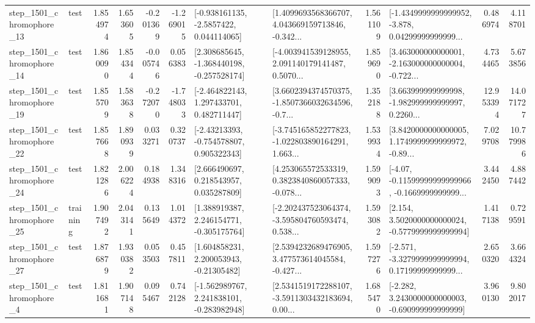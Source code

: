 \begin{tabular}{llrrrrllrlrr}
 step\_1501\_chromophore\_13 &      test &      1.854974 &    1.653605 &     -0.201369 & -1.269015 &     [-0.938161135, -2.5857422, 0.044114065] &  [1.4099693568366707, 4.043669159713846, -0.342... &       1.561109 &  [-1.4349999999999952, -3.878, 0.04299999999999... &            0.486974 &          4.118701 \\
 step\_1501\_chromophore\_14 &      test &      1.860090 &    1.854344 &     -0.005746 &  0.056383 &   [2.308685645, -1.368440198, -0.257528174] &  [-4.003941539128955, 2.091140179141487, 0.5070... &       1.859690 &  [3.463000000000001, -2.163000000000004, -0.722... &            4.734465 &          5.673856 \\
 step\_1501\_chromophore\_19 &      test &      1.855709 &    1.583638 &     -0.272070 & -1.748033 &    [-2.464822143, 1.297433701, 0.482711447] &  [3.6602394374570375, -1.8507366032634596, -0.7... &       1.352188 &  [3.663999999999998, -1.982999999999997, 0.2260... &           12.953394 &         14.071727 \\
 step\_1501\_chromophore\_22 &      test &      1.857668 &    1.890939 &      0.033271 &  0.320737 &    [-2.43213393, -0.754578807, 0.905322343] &  [-3.745165852277823, -1.022803890164291, 1.663... &       1.539934 &  [3.8420000000000005, 1.1749999999999972, -0.89... &            7.029708 &         10.779986 \\
 step\_1501\_chromophore\_24 &      test &      1.821286 &    2.006224 &      0.184938 &  1.348316 &     [2.666490697, 0.218543957, 0.035287809] &  [4.253065572533319, 0.3823840860057333, -0.078... &       1.599093 &  [-4.07, -0.11599999999999966, -0.1669999999999... &            3.442450 &          4.887442 \\
 step\_1501\_chromophore\_25 &  training &      1.907492 &    2.043141 &      0.135649 &  1.014372 &    [1.388919387, 2.246154771, -0.305175764] &  [-2.202437523064374, -3.595804760593474, 0.538... &       1.593082 &   [2.154, 3.5020000000000024, -0.5779999999999994] &            1.417138 &          0.729591 \\
 step\_1501\_chromophore\_27 &      test &      1.876879 &    1.930382 &      0.053503 &  0.457811 &     [1.604858231, 2.200053943, -0.21305482] &  [2.5394232689476905, 3.477573614045584, -0.427... &       1.597276 &  [-2.571, -3.3279999999999994, 0.17199999999999... &            2.650320 &          3.664324 \\
  step\_1501\_chromophore\_4 &      test &      1.811681 &    1.907148 &      0.095467 &  0.742128 &   [-1.562989767, 2.241838101, -0.283982948] &  [2.5341519172288107, -3.5911303432183694, 0.00... &       1.685470 &   [-2.282, 3.2430000000000003, -0.690999999999999] &            3.960130 &          9.802017 \\

\end{tabular}

